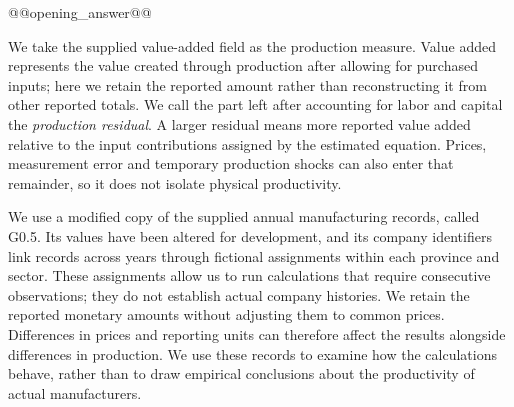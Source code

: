 \GOneBegin
{}

@@opening_answer@@

We take the supplied value-added field as the production measure. Value added represents the value created through production after allowing for purchased inputs; here we retain the reported amount rather than reconstructing it from other reported totals. We call the part left after accounting for labor and capital the \emph{production residual}. A larger residual means more reported value added relative to the input contributions assigned by the estimated equation. Prices, measurement error and temporary production shocks can also enter that remainder, so it does not isolate physical productivity.

We use a modified copy of the supplied annual manufacturing records, called G0.5. Its values have been altered for development, and its company identifiers link records across years through fictional assignments within each province and sector. These assignments allow us to run calculations that require consecutive observations; they do not establish actual company histories. We retain the reported monetary amounts without adjusting them to common prices. Differences in prices and reporting units can therefore affect the results alongside differences in production. We use these records to examine how the calculations behave, rather than to draw empirical conclusions about the productivity of actual manufacturers.

